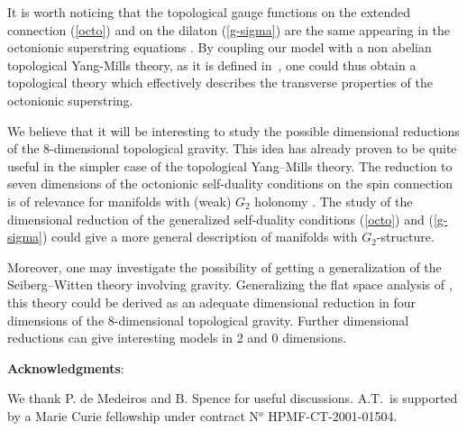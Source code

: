 \documentclass[a4paper,12pt]{article}
\begin{document}
It is worth noticing that the topological gauge functions
on the extended connection (\ref{octo}) and 
on the dilaton (\ref{g-sigma}) are the same appearing in the
octonionic superstring equations \cite{stro}.
By coupling our model with a non abelian
topological Yang-Mills theory, as it is defined 
in~\cite{bakasi,Acharya:1997gp},
one could thus obtain a topological theory which effectively
describes the transverse properties of the octonionic
superstring.

We believe that it will be interesting to study the possible 
dimensional reductions of the 8-dimensional topological gravity. 
This idea  has already  proven to be quite useful in the simpler case of 
the topological Yang--Mills theory.
The reduction to seven dimensions of the octonionic
self-duality conditions on the spin connection
is of relevance for
manifolds with (weak) $G_2$ holonomy     
\cite{Bilal}. The study of the dimensional reduction
of the generalized self-duality conditions (\ref{octo})
and (\ref{g-sigma}) could give a more general description
of manifolds with $G_2$-structure.

Moreover, one may investigate the possibility
of getting a generalization of the Seiberg--Witten   
theory involving gravity.  Generalizing the flat space analysis 
of \cite{bakasi}, this theory could be derived as an adequate dimensional
reduction in four dimensions of the 8-dimensional 
topological gravity. Further dimensional reductions can give 
interesting models  in 2 and 0 dimensions.


\vspace{1.cm}

{\bf Acknowledgments}: 

\vspace{.5cm}
\noindent 
We thank P. de Medeiros and B. Spence for useful discussions.
A.T.~is supported by a Marie Curie fellowship under contract
N$^o$ HPMF-CT-2001-01504.
\end{document}
